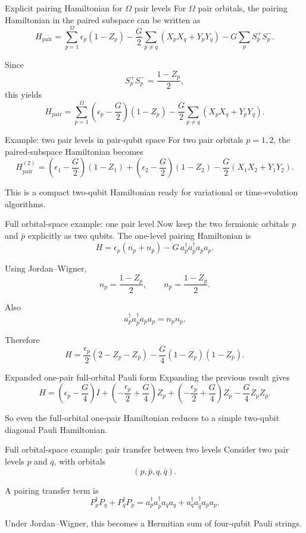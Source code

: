 \documentclass[aspectratio=169]{beamer}
\begin{document}
\begin{frame}{Explicit pairing Hamiltonian for \(\Omega\) pair levels}
For \(\Omega\) pair orbitals, the pairing Hamiltonian in the paired subspace can be written as
\[
H_{\mathrm{pair}}
=
\sum_{p=1}^{\Omega} \epsilon_p (1-Z_p)
-
\frac{G}{2}\sum_{p\ne q}(X_pX_q+Y_pY_q)
-
G\sum_p S_p^+S_p^-.
\]

Since
\[
S_p^+S_p^- = \frac{1-Z_p}{2},
\]
this yields
\[
H_{\mathrm{pair}}
=
\sum_{p=1}^{\Omega}\left(\epsilon_p-\frac{G}{2}\right)(1-Z_p)
-
\frac{G}{2}\sum_{p\ne q}(X_pX_q+Y_pY_q).
\]
\end{frame}

\begin{frame}{Example: two pair levels in pair-qubit space}
For two pair orbitals \(p=1,2\), the paired-subspace Hamiltonian becomes
\[
H_{\mathrm{pair}}^{(2)}
=
\left(\epsilon_1-\frac{G}{2}\right)(1-Z_1)
+
\left(\epsilon_2-\frac{G}{2}\right)(1-Z_2)
-
\frac{G}{2}(X_1X_2+Y_1Y_2).
\]

This is a compact two-qubit Hamiltonian ready for variational or time-evolution algorithms.
\end{frame}

\begin{frame}{Full orbital-space example: one pair level}
Now keep the two fermionic orbitals \(p\) and \(\bar p\) explicitly as two qubits.
The one-level pairing Hamiltonian is
\[
H = \epsilon_p(n_p+n_{\bar p}) - G\, a_p^\dagger a_{\bar p}^\dagger a_{\bar p} a_p.
\]

Using Jordan--Wigner,
\[
n_p=\frac{1-Z_p}{2},\qquad
n_{\bar p}=\frac{1-Z_{\bar p}}{2}.
\]

Also
\[
a_p^\dagger a_{\bar p}^\dagger a_{\bar p} a_p = n_p n_{\bar p}.
\]

Therefore
\[
H
=
\frac{\epsilon_p}{2}(2 - Z_p - Z_{\bar p})
-
\frac{G}{4}(1-Z_p)(1-Z_{\bar p}).
\]
\end{frame}

\begin{frame}{Expanded one-pair full-orbital Pauli form}
Expanding the previous result gives
\[
H
=
\left(\epsilon_p-\frac{G}{4}\right)I
+
\left(-\frac{\epsilon_p}{2}+\frac{G}{4}\right)Z_p
+
\left(-\frac{\epsilon_p}{2}+\frac{G}{4}\right)Z_{\bar p}
-
\frac{G}{4} Z_p Z_{\bar p}.
\]

So even the full-orbital one-pair Hamiltonian reduces to a simple two-qubit diagonal Pauli Hamiltonian.
\end{frame}

\begin{frame}{Full orbital-space example: pair transfer between two levels}
Consider two pair levels \(p\) and \(q\), with orbitals
\[
(p,\bar p,q,\bar q).
\]

A pairing transfer term is
\[
P_p^\dagger P_q + P_q^\dagger P_p
=
a_p^\dagger a_{\bar p}^\dagger a_{\bar q} a_q
+
a_q^\dagger a_{\bar q}^\dagger a_{\bar p} a_p.
\]

Under Jordan--Wigner, this becomes a Hermitian sum of four-qubit Pauli strings.
\end{frame}
\end{document}
